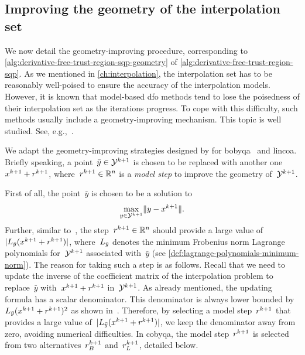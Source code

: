 \subsection{Improving the geometry of the interpolation set}
\label{subsec:geometry-improvement}

We now detail the geometry-improving procedure, corresponding to \cref{alg:derivative-free-trust-region-sqp-geometry} of \cref{alg:derivative-free-trust-region-sqp}.
As we mentioned in \cref{ch:interpolation}, the interpolation set has to be reasonably well-poised to ensure the accuracy of the interpolation models.
However, it is known that model-based \gls{dfo} methods tend to lose the poisedness of their interpolation set as the iterations progress.
To cope with this difficulty, such methods usually include a geometry-improving mechanism.
This topic is well studied. See, e.g.,~\cite{Conn_Scheinberg_Vicente_2008a,Conn_Scheinberg_Vicente_2008b,Fasano_Morales_Nocedal_2009,Scheinberg_Toint_2010}.

We adapt the geometry-improving strategies designed by \citeauthor{Powell_2009} for \gls{bobyqa}~\cite{Powell_2009} and \gls{lincoa}.
Briefly speaking, a point~$\bar{y} \in \xpt[k + 1]$ is chosen to be replaced with another one~$\iter[k + 1] + \rstep[k + 1]$, where~$\rstep[k + 1] \in \R^n$ is a \emph{model step} to improve the geometry of~$\xpt[k + 1]$.

First of all, the point~$\bar{y}$ is chosen to be a solution to
\begin{equation}
    \label{eq:choice-point-geometry-improving}
    \max_{y \in \xpt[k + 1]} \norm{y - \iter[k + 1]}.
\end{equation}
Further, similar to~\cite[Eq.~(6.6)]{Powell_2006}, the step~$\rstep[k + 1] \in \R^n$ should provide a large value of~$\abs{\lagp[\bar{y}](\iter[k + 1] + \rstep[k + 1])}$, where~$\lagp[\bar{y}]$ denotes the minimum Frobenius norm Lagrange polynomials for~$\xpt[k + 1]$ associated with~$\bar{y}$ (see \cref{def:lagrange-polynomials-minimum-norm}).
The reason for taking such a step is as follows.
Recall that we need to update the inverse of the coefficient matrix of the interpolation problem to replace~$\bar{y}$ with~$\iter[k + 1] + \rstep[k + 1]$ in~$\xpt[k + 1]$.
As already mentioned, the updating formula has a scalar denominator.
This denominator is always lower bounded by~$\lagp[\bar{y}](\iter[k + 1] + \rstep[k + 1])^2$ as shown in~\cite[Eq.~(6.5)]{Powell_2006}.
Therefore, by selecting a model step~$\rstep[k + 1]$ that provides a large value of~$\abs{\lagp[\bar{y}](\iter[k + 1] + \rstep[k + 1])}$, we keep the denominator away from zero, avoiding numerical difficulties.
In \gls{cobyqa}, the model step~$\rstep[k + 1]$ is selected from two alternatives~$\rstep[k + 1]_B$ and~$\rstep[k + 1]_L$, detailed below.

